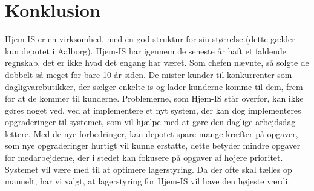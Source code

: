 \section{Konklusion}
Hjem-IS er en virksomhed, med en god struktur for sin størrelse (dette gælder kun depotet i Aalborg). Hjem-IS har igennem de seneste år haft et faldende regnskab, det er ikke hvad det engang har været. Som chefen nævnte, så solgte de dobbelt så meget for bare 10 år siden. De mister kunder til konkurrenter som dagligvarebutikker, der sælger enkelte is og lader kunderne komme til dem, frem for at de kommer til kunderne. Problemerne, som Hjem-IS står overfor, kan ikke gøres noget ved, ved at implementere et nyt system, der kan dog implementeres opgraderinger til systemet, som vil hjælpe med at gøre den daglige arbejdsdag lettere. Med de nye forbedringer, kan depotet spare mange kræfter på opgaver, som nye opgraderinger hurtigt vil kunne erstatte, dette betyder mindre opgaver for medarbejderne, der i stedet kan fokusere på opgaver af højere prioritet. Systemet vil være med til at optimere lagerstyring. Da der ofte skal tælles op manuelt, har vi valgt, at lagerstyring for Hjem-IS vil have den højeste værdi. 